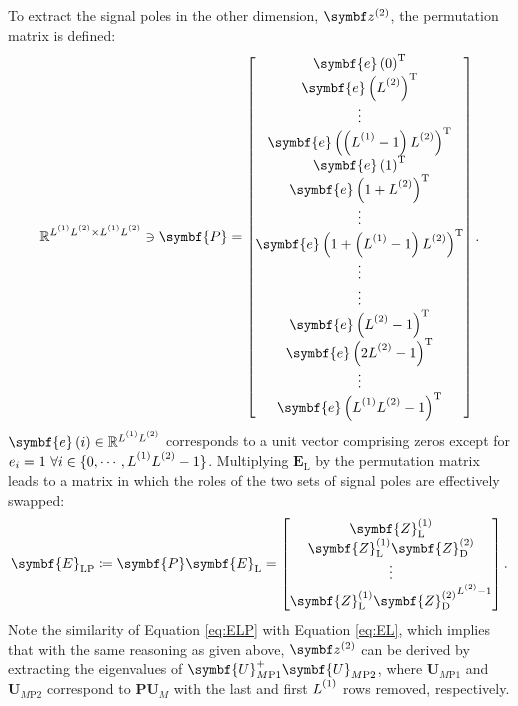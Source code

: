 {To extract the signal poles in the other dimension, $\bdztwo$, the permutation
matrix is defined:
\begin{equation}
    \mathbb{R}^{\Lone \Ltwo \times \Lone \Ltwo} \ni
    \symbf{P} =
    \begin{bmatrix}
        \symbf{e}\left(0\right)\T \\
        \symbf{e}\left(\Ltwo\right)\T \\
        \vdots \\
        \symbf{e}\left(\left(\Lone - 1\right)\Ltwo\right)\T \\
        \symbf{e}\left(1\right)\T \\
        \symbf{e}\left(1 + \Ltwo\right)\T \\
        \vdots \\
        \symbf{e}\left(1 + \left(\Lone - 1\right)\Ltwo\right)\T \\
        \vdots \\
        \vdots \\
        \symbf{e}\left(\Ltwo - 1\right)\T \\
        \symbf{e}\left(2\Ltwo - 1\right)\T \\
        \vdots \\
        \symbf{e}\left(\Lone \Ltwo - 1\right)\T \\
    \end{bmatrix}.
\end{equation}
$\symbf{e}\left(i\right) \in \mathbb{R}^{\Lone \Ltwo}$ corresponds to a unit
vector comprising zeros except for $e_i = 1\ \forall i \in \lbrace 0, \cdots,
\Lone\Ltwo - 1 \rbrace$.
Multiplying $\symbf{E}_{\text{L}}$ by the permutation matrix leads to a matrix
in which the roles of the two sets of signal poles are effectively swapped:
\begin{equation}
    \symbf{E}_{\text{LP}} \coloneq \symbf{P} \symbf{E}_{\text{L}} =
    \begin{bmatrix}
        \symbf{Z}^{(1)}_{\text{L}} \\
        \symbf{Z}^{(1)}_{\text{L}} \symbf{Z}^{(2)}_{\text{D}} \\
        \vdots \\
        \symbf{Z}^{(1)}_{\text{L}} {\symbf{Z}^{(2)}_{\text{D}}}^{\Ltwo - 1} \\
    \end{bmatrix}.\label{eq:ELP}
\end{equation}
Note the similarity of Equation \ref{eq:ELP} with Equation \ref{eq:EL}, which
implies that with the same reasoning as given above, $\bdztwo$ can be derived
by extracting the eigenvalues of $\symbf{U}_{M\text{P}1}^+
\symbf{U}_{M\text{P}2}^{\vphantom{+}}$, where $\symbf{U}_{M\text{P}1}$ and
$\symbf{U}_{M\text{P}2}$ correspond to $\symbf{P} \symbf{U}_M$
with the last and first $\Lone$ rows removed, respectively.

}

